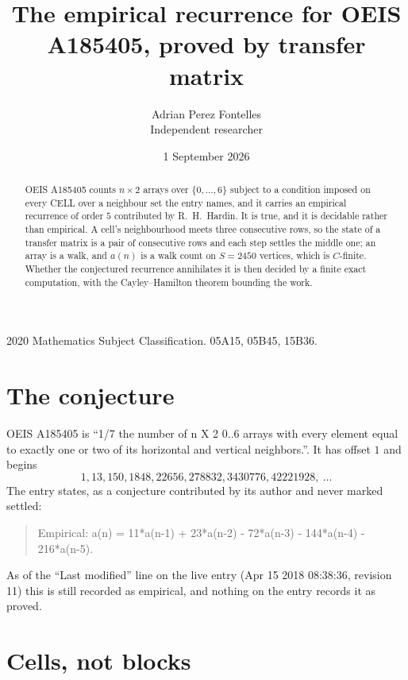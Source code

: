 \documentclass[11pt,a4paper]{article}
\title{The empirical recurrence for OEIS A185405, proved by transfer matrix}
\author{Adrian Perez Fontelles\\ \small Independent researcher}
\date{1 September 2026}
\theoremstyle{plain}
\theoremstyle{definition}
\begin{document}
\maketitle

\begin{abstract}
OEIS A185405 counts $n\times2$ arrays over $\{0,\dots,6\}$ subject to a condition imposed on
every CELL over a neighbour set the entry names, and it carries an empirical recurrence of
order $5$ contributed by R.~H.~Hardin. It is true, and it is decidable rather than
empirical. A cell's neighbourhood meets three consecutive rows, so the state of a transfer
matrix is a pair of consecutive rows and each step settles the middle one; an array is a
walk, and $a(n)$ is a walk count on $S=2450$ vertices, which is $C$-finite. Whether the
conjectured recurrence annihilates it is then decided by a finite exact computation, with the
Cayley--Hamilton theorem bounding the work.
\end{abstract}

\noindent\small 2020 Mathematics Subject Classification. 05A15, 05B45, 15B36.\normalsize

\section{The conjecture}

OEIS A185405 is ``1/7 the number of n X 2 0..6 arrays with every element equal to exactly one or two of its horizontal and vertical neighbors.''. It has offset $1$ and begins
\[
1, 13, 150, 1848, 22656, 278832, 3430776, 42221928,\ \dots
\]
The entry states, as a conjecture contributed by its author and never marked settled:
\begin{quote}
Empirical: a(n) = 11*a(n-1) + 23*a(n-2) - 72*a(n-3) - 144*a(n-4) - 216*a(n-5).
\end{quote}
As of the ``Last modified'' line on the live entry (Apr 15 2018 08:38:36, revision 11) this is still
recorded as empirical, and nothing on the entry records it as proved.

\section{Cells, not blocks}
\end{document}

